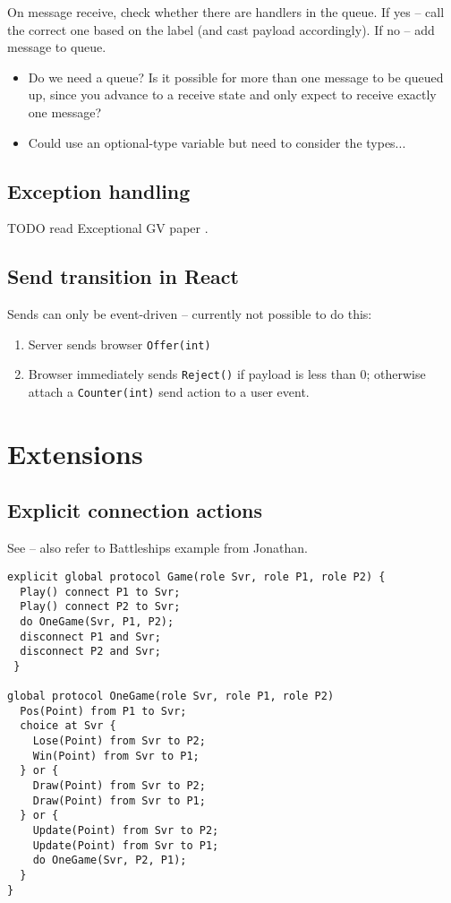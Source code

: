 \documentclass{article}
\begin{document}
On message receive, check whether there are handlers
in the queue. 
If yes -- call the correct one based on
the label (and cast payload accordingly).
If no -- add message to queue.

\begin{itemize}
\item
Do we need a queue? Is it possible for more than
one message to be queued up, since you advance to
a receive state and only expect to receive exactly
one message? 

\item
Could use an optional-type variable
but need to consider the types...
\end{itemize}

\subsection*{Exception handling}

TODO read Exceptional GV paper \cite{ExceptionalGV}.

\subsection*{Send transition in React}
Sends can only be event-driven --
currently not possible to do this:

\begin{enumerate}
\item Server sends browser 
\texttt{Offer(int)}
\item Browser immediately sends 
\texttt{Reject()} if payload is less than 0;
otherwise attach a \texttt{Counter(int)} 
send action to a user event.
\end{enumerate}

\section{Extensions}

\subsection*{Explicit connection actions}

See \cite{FASE2017} -- also refer to Battleships 
example from Jonathan.

\begin{lstlisting}
explicit global protocol Game(role Svr, role P1, role P2) {
  Play() connect P1 to Svr;
  Play() connect P2 to Svr;
  do OneGame(Svr, P1, P2);
  disconnect P1 and Svr;
  disconnect P2 and Svr;
 }

global protocol OneGame(role Svr, role P1, role P2)
  Pos(Point) from P1 to Svr;
  choice at Svr {
    Lose(Point) from Svr to P2;
    Win(Point) from Svr to P1;
  } or {
    Draw(Point) from Svr to P2;
    Draw(Point) from Svr to P1;
  } or {
    Update(Point) from Svr to P2;
    Update(Point) from Svr to P1;
    do OneGame(Svr, P2, P1);
  }
}

\end{lstlisting}
\end{document}
